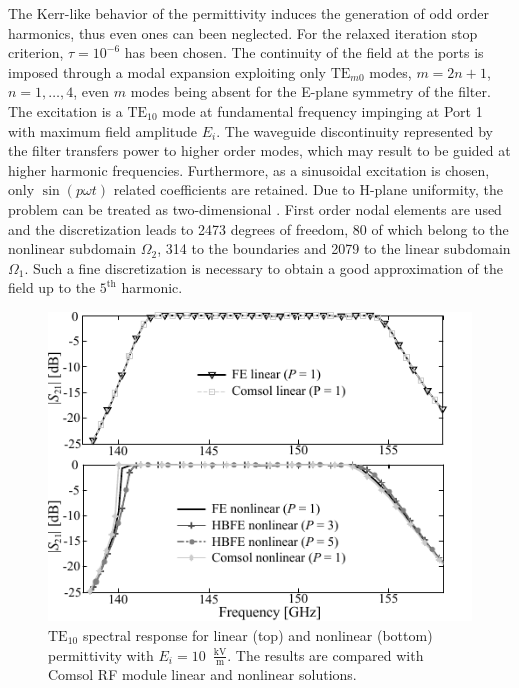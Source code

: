 The Kerr-like behavior of the permittivity induces the generation of odd order harmonics, thus 
even ones can been neglected. For the relaxed
iteration stop criterion, $\tau = 10^{-6}$ has been chosen.
The continuity of the field at the ports is imposed through a modal expansion 
exploiting only $\mathrm{TE}_{m0}$ modes, $m = 2n+1$, $n=1,\ldots,4$, even $m$
modes being absent for the E-plane symmetry of the filter.  
The excitation is a $\mathrm{TE}_{10}$ mode at fundamental frequency impinging at
Port 1 with maximum field amplitude $E_ i$. The 
waveguide discontinuity represented by the filter transfers power to higher order
modes, which may result to be guided at higher harmonic frequencies.
Furthermore, as a sinusoidal excitation is chosen, only $\sin(p \omega t)$ 
related coefficients are retained.
Due to H-plane uniformity, the problem can be treated as two-dimensional \cite{pelosi2009quick}.
First order nodal elements are used and the discretization leads to 2473
degrees of freedom, 80 of which belong to the nonlinear subdomain $\Omega_2$, 
314 to the boundaries and 2079 to the linear subdomain $\Omega_1$. Such a fine
discretization is necessary to obtain a good approximation of the field up to 
the $5^\mathrm{th}$ harmonic.
%
\begin{figure}[!ht]
\centering
\includegraphics[width=14.8cm]{spectrumNHarm}
\caption{$\mathrm{TE}_{10}$ spectral response for linear (top) and nonlinear 
(bottom) permittivity with $E_i = 10$~$\frac{\mathrm{kV}}{\mathrm{m}}$. The results are compared with Comsol
RF module linear and nonlinear solutions.}
\label{fig:spectrumNHarm}
\end{figure}

